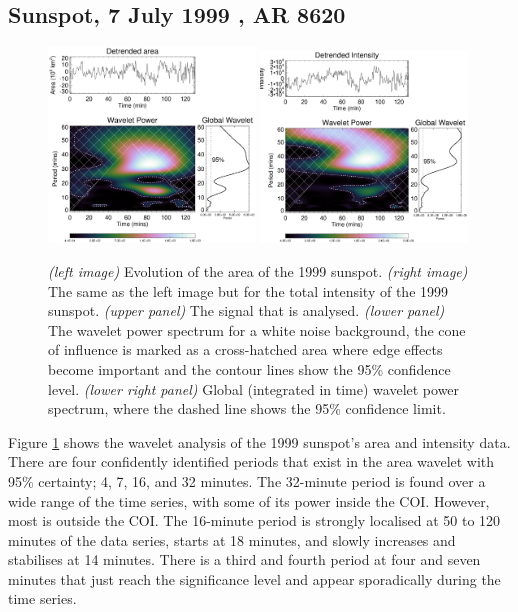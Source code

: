 \subsection{Sunspot, 7 July 1999 , AR 8620}

   \begin{figure}
	   \centering
       \includegraphics[width=0.49\textwidth]{1999_wl.eps}
       \includegraphics[width=0.49\textwidth]{1999_wl_inten.eps}
	   \caption{
				\textit{(left image)} Evolution of the area of the 1999 sunspot.
				\textit{(right image)} The same as the left image but for the total intensity of the 1999 sunspot.
				\textit{(upper panel)} The signal that is analysed.
				\textit{(lower panel)} The wavelet power spectrum for a white noise background, the cone of influence is marked as a cross-hatched area where edge effects become important and the contour lines show the 95\% confidence level.
				\textit{(lower right panel)} Global (integrated in time) wavelet power spectrum, where the dashed line shows the 95\% confidence limit.   
				}
	   \label{1999sunspot}
   \end{figure}
   	
	Figure \ref{1999sunspot} shows the wavelet analysis of the 1999 sunspot's area and intensity data. There are four confidently identified periods that exist in the area wavelet with 95\% certainty; 4, 7, 16, and 32 minutes.
	The 32-minute period is found over a wide range of the time series, with some of its power inside the COI.
	However, most is outside the COI.
	The 16-minute period is strongly localised at 50 to 120 minutes of the data series, starts at 18 minutes, and slowly increases and stabilises at 14 minutes.
	There is a third and fourth period at four and  seven minutes that just reach the significance level and appear sporadically during the time series.
	
